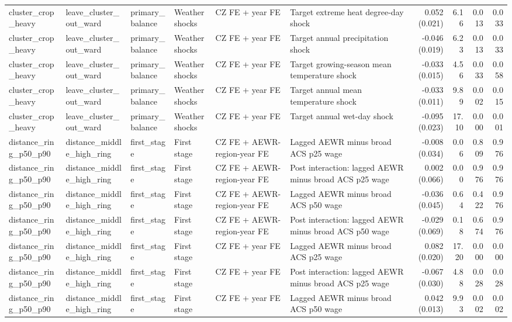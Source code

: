 \begin{tabular}{llllllrrrr}
cluster_crop_heavy & leave_cluster_out_ward & primary_balance & Weather shocks & CZ FE + year FE & Target extreme heat degree-day shock & 0.052 (0.021) & 6.16 & 0.013 & 0.033 \\
cluster_crop_heavy & leave_cluster_out_ward & primary_balance & Weather shocks & CZ FE + year FE & Target annual precipitation shock & -0.046 (0.019) & 6.23 & 0.013 & 0.033 \\
cluster_crop_heavy & leave_cluster_out_ward & primary_balance & Weather shocks & CZ FE + year FE & Target growing-season mean temperature shock & -0.033 (0.015) & 4.56 & 0.033 & 0.058 \\
cluster_crop_heavy & leave_cluster_out_ward & primary_balance & Weather shocks & CZ FE + year FE & Target annual mean temperature shock & -0.033 (0.011) & 9.89 & 0.002 & 0.015 \\
cluster_crop_heavy & leave_cluster_out_ward & primary_balance & Weather shocks & CZ FE + year FE & Target annual wet-day shock & -0.095 (0.023) & 17.10 & 0.000 & 0.001 \\
distance_ring_p50_p90 & distance_middle_high_ring & first_stage & First stage & CZ FE + AEWR-region-year FE & Lagged AEWR minus broad ACS p25 wage & -0.008 (0.034) & 0.06 & 0.809 & 0.976 \\
distance_ring_p50_p90 & distance_middle_high_ring & first_stage & First stage & CZ FE + AEWR-region-year FE & Post interaction: lagged AEWR minus broad ACS p25 wage & 0.002 (0.066) & 0.00 & 0.976 & 0.976 \\
distance_ring_p50_p90 & distance_middle_high_ring & first_stage & First stage & CZ FE + AEWR-region-year FE & Lagged AEWR minus broad ACS p50 wage & -0.036 (0.045) & 0.64 & 0.422 & 0.976 \\
distance_ring_p50_p90 & distance_middle_high_ring & first_stage & First stage & CZ FE + AEWR-region-year FE & Post interaction: lagged AEWR minus broad ACS p50 wage & -0.029 (0.069) & 0.18 & 0.674 & 0.976 \\
distance_ring_p50_p90 & distance_middle_high_ring & first_stage & First stage & CZ FE + year FE & Lagged AEWR minus broad ACS p25 wage & 0.082 (0.020) & 17.20 & 0.000 & 0.000 \\
distance_ring_p50_p90 & distance_middle_high_ring & first_stage & First stage & CZ FE + year FE & Post interaction: lagged AEWR minus broad ACS p25 wage & -0.067 (0.030) & 4.88 & 0.028 & 0.028 \\
distance_ring_p50_p90 & distance_middle_high_ring & first_stage & First stage & CZ FE + year FE & Lagged AEWR minus broad ACS p50 wage & 0.042 (0.013) & 9.93 & 0.002 & 0.002 \\

\end{tabular}

